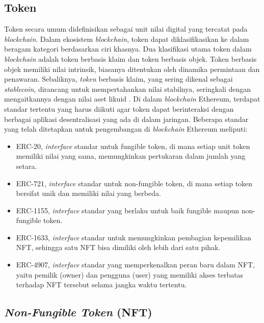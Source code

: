 \subsection{Token}
Token secara umum didefinisikan sebagai unit nilai digital yang tercatat pada \emph{blockchain}. Dalam ekosistem \emph{blockchain}, token dapat diklasifikasikan ke dalam beragam kategori berdasarkan ciri khasnya. Dua klasifikasi utama token dalam \emph{blockchain} adalah token berbasis klaim dan token berbasis objek. Token berbasis objek memiliki nilai intrinsik, biasanya ditentukan oleh dinamika permintaan dan penawaran. Sebaliknya, \emph{token} berbasis klaim, yang sering dikenal sebagai \emph{stablecoin}, dirancang untuk mempertahankan nilai stabilnya, seringkali dengan mengaitkannya dengan nilai aset likuid \parencite{Freni2022}. 
Di dalam \emph{blockchain} Ethereum, terdapat standar tertentu yang harus diikuti agar token dapat berinteraksi dengan berbagai aplikasi desentralisasi yang ada di dalam jaringan. Beberapa standar yang telah ditetapkan untuk pengembangan di \emph{blockchain} Ethereum meliputi:
\begin{itemize}
    \item ERC-20, \emph{interface} standar untuk fungible token, di mana setiap unit token memiliki nilai yang sama, memungkinkan pertukaran dalam jumlah yang setara.
    \item ERC-721, \emph{interface} standar untuk non-fungible token, di mana setiap token bersifat unik dan memiliki nilai yang berbeda.
    \item ERC-1155, \emph{interface} standar yang berlaku untuk baik fungible maupun non-fungible token.
    \item ERC-1633, \emph{interface} standar untuk memungkinkan pembagian kepemilikan NFT, sehingga satu NFT bisa dimiliki oleh lebih dari satu pihak.
    \item ERC-4907, \emph{interface} standar yang memperkenalkan peran baru dalam NFT, yaitu pemilik (owner) dan pengguna (user) yang memiliki akses terbatas terhadap NFT tersebut selama jangka waktu tertentu.
\end{itemize}

\subsection{\emph{Non-Fungible Token} (NFT)}

